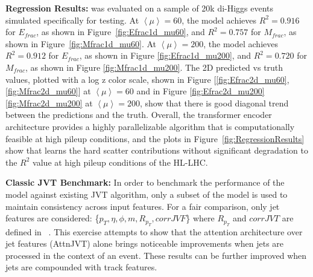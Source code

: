 \textbf{Regression Results:} \myname{} was evaluated on a sample of 20k di-Higgs events simulated specifically for testing. At $\left \langle \mu \right \rangle=60$, the model achieves $R^2=0.916$ for $E_{frac}$, as shown in Figure~\ref{fig:Efrac1d_mu60}, and $R^2=0.757$ for $M_{frac}$, as shown in Figure~\ref{fig:Mfrac1d_mu60}. At $\left \langle \mu \right \rangle=200$, the model achieves $R^2=0.912$ for $E_{frac}$, as shown in Figure \ref{fig:Efrac1d_mu200}, and $R^2=0.720$ for $M_{frac}$, as shown in Figure \ref{fig:Mfrac1d_mu200}. The 2D predicted vs truth values, plotted with a log z color scale, shown in Figure [\ref{fig:Efrac2d_mu60},\ref{fig:Mfrac2d_mu60}] at $\left \langle \mu \right \rangle=60$ and in Figure \ref{fig:Efrac2d_mu200} \ref{fig:Mfrac2d_mu200} at $\left \langle \mu \right \rangle=200$, show that there is good diagonal trend between the predictions and the truth. Overall, the transformer encoder architecture provides a highly parallelizable algorithm that is computationally feasible at high pileup conditions, and the plots in Figure~\ref{fig:RegressionResults} show that \myname{} learns the hard scatter contributions without significant degradation to the $R^2$ value at high pileup conditions of the HL-LHC.


\newpage
\textbf{Classic JVT Benchmark:} In order to benchmark the performance of the model against existing JVT algorithm, only a subset of the model is used to maintain consistency across input features. For a fair comparison, only jet features are considered: \{$p_T,\eta,\phi,m,R_{p_T},corrJVF$\} where $R_{p_T}$ and $corrJVT$ are defined in ~\cite{ATLAS-CONF-2014-018}. This exercise attempts to show that the attention architecture over jet features (AttnJVT) alone brings noticeable improvements when jets are processed in the context of an event. These results can be further improved when jets are compounded with track features.

